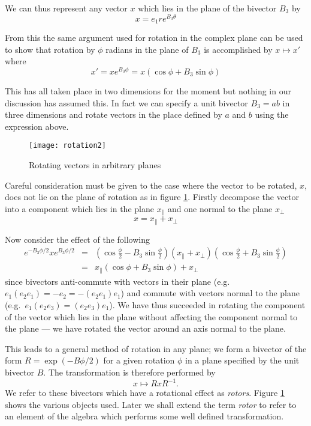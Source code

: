 We can thus represent any vector $x$ which lies in the plane of the
bivector $B_3$ by
\[
x=e_1re^{B_3\theta}
\]

From this the same argument used for rotation in the complex plane 
can be used to show that rotation by
$\phi$ radians in the plane of $B_3$ is accomplished by $x \mapsto x'$
where
\begin{displaymath}
x' = xe^{B_3\phi} = x (\cos \phi + B_3 \sin \phi)
\end{displaymath}

This has all taken place in two dimensions for the moment but nothing in our
discussion has assumed this. In fact we can specify a unit bivector $B_3 = ab$ in
three dimensions and rotate vectors in the place defined by $a$ and $b$ using
the expression above.

\begin{figure}
\centering
\texttt{[image: rotation2]}
\caption{Rotating vectors in arbitrary planes\label{fig:rotation2}}
\end{figure}

Careful consideration must be given to the case where the vector to be
rotated, $x$, does not lie on the plane of rotation as in figure
\ref{fig:rotation2}. Firstly decompose the
vector into a component which lies in the plane $x_\parallel$ and one
normal to the plane $x_\perp$
\[
x = x_\parallel + x_\perp
\]

Now consider the effect of the following
\begin{eqnarray*}
e^{-B_3\phi/2}
x
e^{B_3\phi/2}
& = & \left(\cos \frac{\phi}{2} - B_3 \sin \frac{\phi}{2}\right)
(x_\parallel + x_\perp )
\left(\cos \frac{\phi}{2} + B_3 \sin \frac{\phi}{2}\right) \\
& = & x_\parallel (\cos \phi + B_3 \sin \phi) + x_\perp
\end{eqnarray*}
since bivectors anti-commute with vectors in their plane (e.g. 
$e_1(e_2e_1) = -e_2 = -(e_2e_1)e_1$) and commute with
vectors normal to the plane (e.g.\ $e_1(e_2e_3) = (e_2e_3)e_1$).
We have thus succeeded in rotating the component of the vector 
which lies in the plane without affecting the component normal
to the plane --- we have rotated the vector around an axis normal to
the plane.

This leads to a general method of rotation in any plane; we
form a bivector of the form $R = \exp({-B\phi/2})$ for a given rotation 
$\phi$ in a plane specified by the unit bivector $B$. The transformation
is therefore performed by
\begin{displaymath}
x \mapsto RxR^{-1}.
\end{displaymath}
We refer to these bivectors which have a rotational effect as \emph{rotors}.
Figure \ref{fig:rotation2} shows the various objects used. Later we shall
extend the term \emph{rotor} to refer to an element of the algebra which
performs some well defined transformation.

